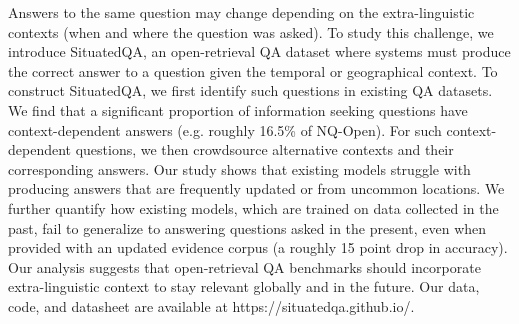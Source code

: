 Answers to the same question may change depending on the extra-linguistic contexts (when and where the question was asked). To study this challenge, we introduce SituatedQA, an open-retrieval QA dataset where systems must produce the correct answer to a question given the temporal or geographical context. To construct SituatedQA, we first identify such questions in existing QA datasets. We find that a significant proportion of information seeking questions have context-dependent answers (e.g. roughly 16.5\% of NQ-Open). For such context-dependent questions, we then crowdsource alternative contexts and their corresponding answers. Our study shows that existing models struggle with producing answers that are frequently updated or from uncommon locations. We further quantify how existing models, which are trained on data collected in the past, fail to generalize to answering questions asked in the present, even when provided with an updated evidence corpus (a roughly 15 point drop in accuracy). Our analysis suggests that open-retrieval QA benchmarks should incorporate extra-linguistic context to stay relevant globally and in the future. Our data, code, and datasheet are available at https://situatedqa.github.io/.
